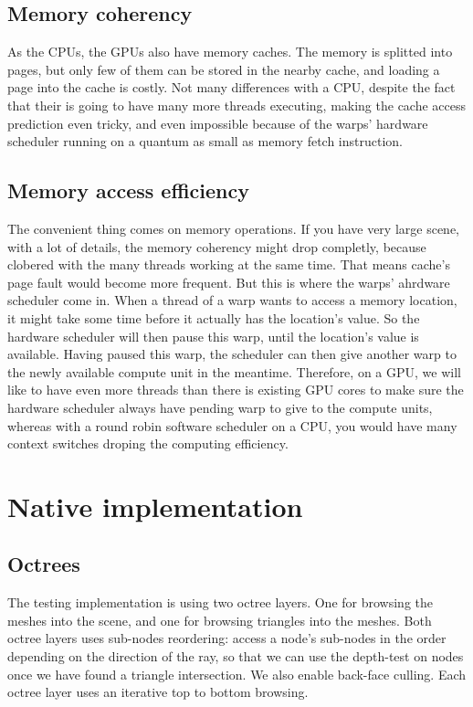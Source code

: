 \documentclass[10pt,twocolumn,a4paper]{article}
\begin{document}
\subsection{Memory coherency}
As the CPUs, the GPUs also have memory caches. The memory is splitted into pages,
but only few of them can be stored in the nearby cache, and loading a page into
the cache is costly. Not many differences with a CPU, despite the fact that
their is going to have many more threads executing, making the cache access prediction
even tricky, and even impossible because of the warps' hardware scheduler running
on a quantum as small as memory fetch instruction.

\subsection{Memory access efficiency}
The convenient thing comes on memory operations. If you have very large scene, with a
lot of details, the memory coherency might drop completly, because clobered with
the many threads working at the same time. That means cache's page fault would become more frequent.
But this is where the warps' ahrdware scheduler come in. When a thread of a
warp wants to access a memory
location, it might take some time before it actually has the location's value.
So the hardware scheduler will then pause this warp, until the location's value
is available. Having paused this warp, the scheduler can then give another
warp to the newly available compute unit in the meantime. Therefore, on a GPU, we will
like to have even more threads than there is existing GPU cores to make sure the
hardware scheduler always have pending warp to give to the compute units, whereas
with a round robin software scheduler on a CPU, you would have many context
switches droping the computing efficiency.

\section{Native implementation}
\subsection{Octrees}
The testing implementation is using two octree layers. One for browsing the meshes
into the scene, and one for browsing triangles into the meshes. Both octree layers
uses sub-nodes reordering: access a node's sub-nodes in the order depending on
the direction of the ray, so that we can use the depth-test on nodes once we
have found a triangle intersection. We also enable back-face culling. Each octree
layer uses an iterative top to bottom browsing.
\end{document}
